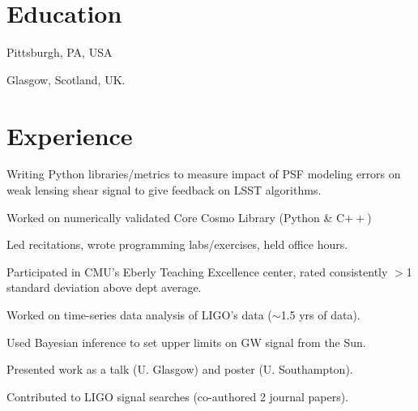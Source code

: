 \documentclass[]{deedy-resume-openfont}
\begin{document}
\hfill
\begin{minipage}[t]{0.66\textwidth} 



\section{\color{Blue} Education} 

 \hfill {}
Pittsburgh, PA, USA
\sectionsep

 \hfill {}
Glasgow, Scotland, UK. $\;\;$  
\sectionsep


\section{\color{Blue} Experience}

 \hfill {}
\vspace{\topsep} %
\begin{tightemize}\item Writing Python libraries/metrics to measure impact of PSF modeling errors on weak lensing shear signal to give feedback on LSST algorithms. \item Worked on numerically validated Core Cosmo Library (Python \& C$++$)
\end{tightemize}
\begin{tightemize}\item Led recitations, wrote programming labs/exercises, held office hours.
\item Participated in CMU's Eberly Teaching Excellence center, rated consistently $>$1 standard deviation above dept average.
\end{tightemize}
\sectionsep

 \hfill {}
\begin{tightemize}
\item Worked on time-series data analysis of LIGO's data ($\sim$1.5 yrs of data).\item Used Bayesian inference to set upper limits on GW signal from the Sun. \item Presented work as a talk (U. Glasgow) and poster (U. Southampton). \item Contributed to LIGO signal searches (co-authored 2 journal papers). \end{tightemize}
\sectionsep


\end{minipage}
\end{document}

